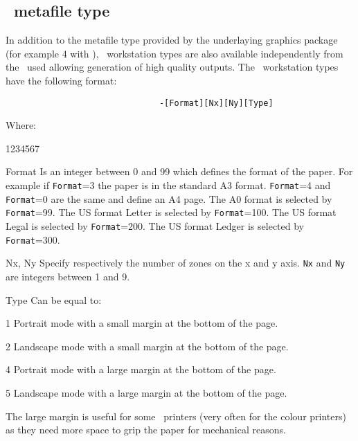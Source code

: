 \subsection{\PS~metafile type}
In addition to the metafile type provided by the underlaying graphics
package (for example 4 with \GKSGRAL), \PS~workstation types
are also available independently from the \UGP~used allowing generation of
high quality outputs. The \PS~workstation types have the following format:
\begin{verbatim}
                               -[Format][Nx][Ny][Type]
\end{verbatim}
    Where:
\begin{DLtt}{1234567}
\item[Format] Is an integer between 0 and 99 which defines the format of the
              paper. For example if {\tt Format}=3 the paper is in the standard
	      A3 format. {\tt Format}=4 and {\tt Format}=0 are the same and
	      define an A4 page. The A0 format is selected by {\tt Format}=99.
              The US format Letter is selected by {\tt Format}=100.
              The US format Legal is selected by {\tt Format}=200.
              The US format Ledger is selected by {\tt Format}=300.
\item[Nx, Ny] Specify respectively the number of zones on the x and y axis.
              {\tt Nx} and {\tt Ny} are integers between 1 and 9.
\item[Type] Can be equal to:
\begin{DLtt}{12}
\item[1] Portrait mode with a small margin at the bottom of the page.
\item[2] Landscape mode with a small margin at the bottom of the page.
\item[4] Portrait mode with a large margin at the bottom of the page.
\item[5] Landscape mode with a large margin at the bottom of the page.

         The large
         margin is useful for some \PS~printers (very often for the colour
         printers)  as they need more space to
	 grip the paper for mechanical reasons.


\end{DLtt}
\end{DLtt}
